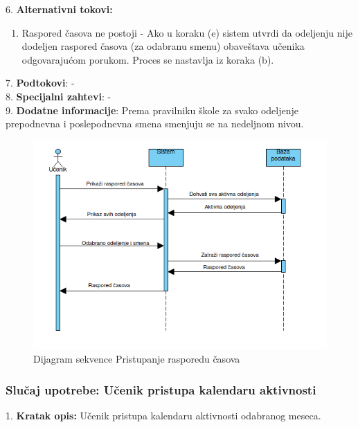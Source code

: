 \documentclass{article}
\begin{document}
6. \textbf{Alternativni tokovi:}
\begin{enumerate} [label=(\roman*)]
\item Raspored časova ne postoji - Ako u koraku (e) sistem utvrdi da odeljenju nije dodeljen raspored časova (za odabranu smenu) obaveštava učenika odgovarajućom porukom. Proces se nastavlja iz koraka (b).

\end{enumerate}

7. \textbf{Podtokovi}: - \\

8. \textbf{Specijalni zahtevi}: - \\

9. \textbf{Dodatne informacije}: Prema pravilniku škole za svako odeljenje prepodnevna i poslepodnevna smena smenjuju se na nedeljnom nivou. \\

\begin{figure} [!ht]
    \begin{center}
        \includegraphics[scale=0.5]{imgs/Dijagram_sekvence_ucenik_pristupa_rasporedu.png}
    \end{center}
\caption{Dijagram sekvence Pristupanje rasporedu časova}
\end{figure}

\newpage
\subsubsection{Slučaj upotrebe: Učenik pristupa kalendaru aktivnosti} 
1. \textbf{Kratak opis:} Učenik pristupa kalendaru aktivnosti odabranog meseca. \\ 
\end{document}
